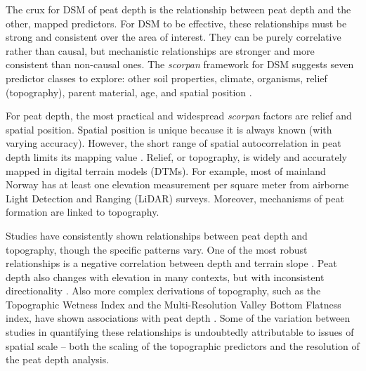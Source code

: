 \documentclass[soil, manuscript]{copernicus}
\begin{document}
The crux for DSM of peat depth is the relationship between peat depth and the other, mapped predictors.
For DSM to be effective, these relationships must be strong and consistent over the area of interest.
They can be purely correlative rather than causal, but mechanistic relationships are stronger and more consistent than non-causal ones.
The \emph{scorpan} framework for DSM suggests seven predictor classes to explore: other soil properties, climate, organisms, relief (topography), parent material, age, and spatial position \citep{mcbratneyDigitalSoilMapping2003}.

For peat depth, the most practical and widespread \emph{scorpan} factors are relief and spatial position.
Spatial position is unique because it is always known (with varying accuracy).
However, the short range of spatial autocorrelation in peat depth limits its mapping value \citep{henglGenericFrameworkSpatial2004}.
Relief, or topography, is widely and accurately mapped in digital terrain models (DTMs).
For example, most of mainland Norway has at least one elevation measurement per square meter from airborne Light Detection and Ranging (LiDAR) surveys.
Moreover, mechanisms of peat formation are linked to topography.

Studies have consistently shown relationships between peat depth and topography, though the specific patterns vary.
One of the most robust relationships is a negative correlation between depth and terrain slope \citep[e.g.,][]{holdenEstimatingCarbonStock2011, parryMethodModellingPeat2012, gatisMappingUplandPeat2019}.
Peat depth also changes with elevation in many contexts, but with inconsistent directionality \citep[e.g.,][]{holdenEstimatingCarbonStock2011, parryMethodModellingPeat2012, rudiyantoDigitalMappingCosteffective2016, rudiyantoOpenDigitalMapping2018, kogantiMappingPeatDepth2023, liFactorsControllingPeat2024}.
Also more complex derivations of topography, such as the Topographic Wetness Index and the Multi-Resolution Valley Bottom Flatness index, have shown associations with peat depth \citep[e.g.,][]{rudiyantoOpenDigitalMapping2018, kogantiMappingPeatDepth2023, liFactorsControllingPeat2024, pohjankukkaDigitalMappingPeat2025}.
Some of the variation between studies in quantifying these relationships is undoubtedly attributable to issues of spatial scale -- both the scaling of the topographic predictors and the resolution of the peat depth analysis.
\end{document}
